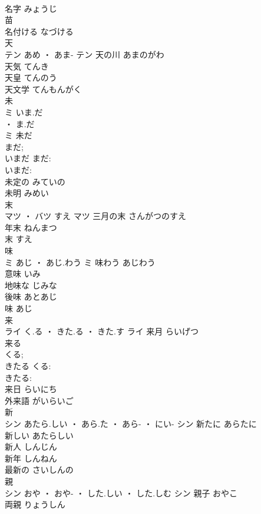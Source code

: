 \documentclass[8pt]{extreport}
\begin{document}
\begin{CJK}{UTF8}{min}
\\	名字	みょうじ	
\\	苗 
\\	名付ける	なづける	
\\	天	
\\	テン	あめ ・ あま-	テン	天の川	あまのがわ	
\\	天気	てんき	
\\	天皇	てんのう	
\\	天文学	てんもんがく	
\\	未	
\\	ミ	いま.だ
\\	・ ま.だ
\\	ミ	未だ 
\\	まだ; 
\\	いまだ	まだ: 
\\	いまだ: 
\\	未定の	みていの	
\\	未明	みめい	
\\	末	
\\	マツ ・ バツ	すえ	マツ	三月の末	さんがつのすえ	
\\	年末	ねんまつ	
\\	末	すえ	
\\	味	
\\	ミ	あじ ・ あじ.わう	ミ	味わう	あじわう	
\\	意味	いみ	
\\	地味な	じみな	
\\	後味	あとあじ	
\\	味	あじ	
\\	来	
\\	ライ	く.る ・ きた.る ・ きた.す	ライ	来月	らいげつ	
\\	来る 
\\	くる; 
\\	きたる	くる:
\\	きたる: 
\\	来日	らいにち	
\\	外来語	がいらいご	
\\	新	
\\	シン	あたら.しい ・ あら.た ・ あら- ・ にい-	シン	新たに	あらたに	
\\	新しい	あたらしい	
\\	新人	しんじん	
\\	新年	しんねん	
\\	最新の	さいしんの	
\\	親	
\\	シン	おや ・ おや- ・ した.しい ・ した.しむ	シン	親子	おやこ	
\\	両親	りょうしん	

\end{CJK}
\end{document}
